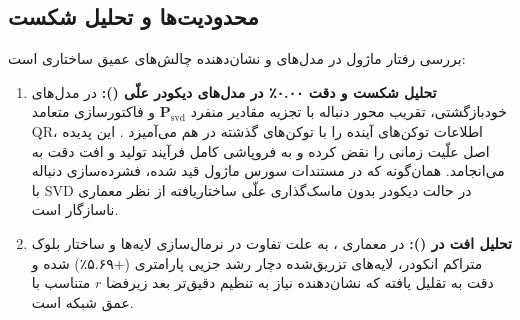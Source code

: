 \subsection{محدودیت‌ها و تحلیل شکست}
بررسی رفتار ماژول در مدل‌های  و  نشان‌دهنده چالش‌های عمیق ساختاری است:
\begin{enumerate}
    \item \textbf{تحلیل شکست و دقت ۰.۰۰٪ در مدل‌های دیکودر علّی ():} در مدل‌های خودبازگشتی، تقریب محور دنباله با تجزیه مقادیر منفرد $\mathbf{P}_{\text{svd}}$ و فاکتورسازی متعامد QR، اطلاعات توکن‌های آینده را با توکن‌های گذشته در هم می‌آمیزد . این پدیده اصل علّیت زمانی  را نقض کرده و به فروپاشی کامل فرآیند تولید و افت دقت به  می‌انجامد. همان‌گونه که در مستندات سورس ماژول قید شده، فشرده‌سازی دنباله با SVD در حالت دیکودر بدون ماسک‌گذاری علّی ساختاریافته از نظر معماری ناسازگار است.
    \item \textbf{تحلیل افت در  ():} در معماری ، به علت تفاوت در نرمال‌سازی لایه‌ها و ساختار بلوک متراکم انکودر، لایه‌های تزریق‌شده دچار رشد جزیی پارامتری (+۵.۶۹٪) شده و دقت به  تقلیل یافته که نشان‌دهنده نیاز به تنظیم دقیق‌تر بعد زیرفضا $r$ متناسب با عمق شبکه است.
\end{enumerate}
